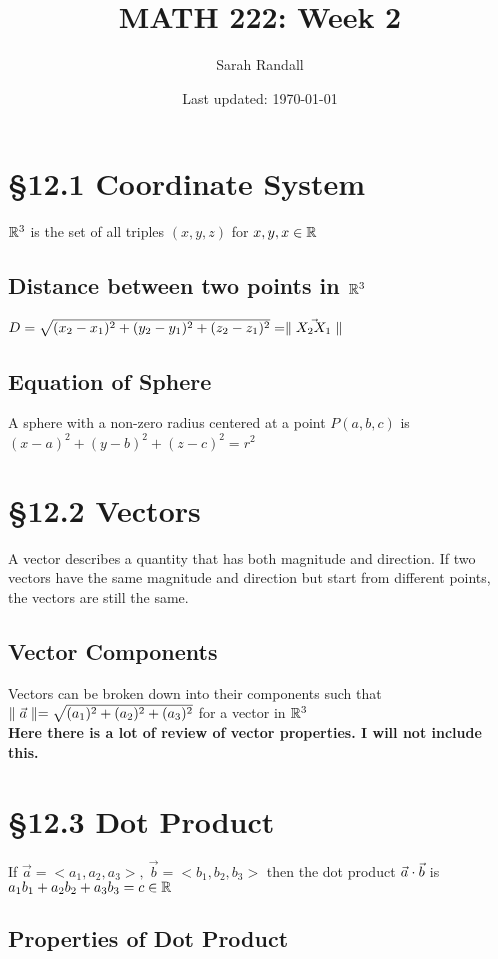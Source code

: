 \documentclass[12 pt]{article}
\author{Sarah Randall}
\date{Last updated: \today}
\title{MATH 222: Week 2}
\begin{document}
	\onehalfspacing
	\maketitle
	\tableofcontents
    \section{\S 12.1 Coordinate System}
        $\mathbb{R}^3$ is the set of all triples $(x,y,z)$ for $x,y,x\in\mathbb{R}$
        \subsection{Distance between two points in $\mathbb{R}^3$}

        $D=\sqrt{(x_2-x_1)^2+(y_2-y_1)^2+(z_2-z_1)^2}=\parallel \vec{X_2X_1} \parallel$
        \subsection{Equation of Sphere}

        A sphere with a non-zero radius centered at a point $P(a,b,c)$ is\\
        $(x-a)^2+(y-b)^2+(z-c)^2=r^2$
	\section{\S 12.2 Vectors}
		A vector describes a quantity that has both magnitude and direction. If two vectors have the same magnitude and direction but start from different points, the vectors are still the same.

		\subsection{Vector Components}

		Vectors can be broken down into their components such that $\parallel \vec{a} \parallel=\sqrt{(a_1)^2+(a_2)^2+(a_3)^2}$ for a vector in $\mathbb{R}^3$\\
		\textbf{Here there is a lot of review of vector properties. I will not include this.}
	\section{\S 12.3 Dot Product}
		\begin{def*}If $\vec{a}=<a_1,a_2,a_3>,\ \vec{b}=<b_1,b_2,b_3>$ then the dot product $\vec{a}\cdot\vec{b}$ is $a_1b_1+a_2b_2+a_3b_3=c\in\mathbb{R}$
		\end{def*}

		\subsection{Properties of Dot Product}
\end{document}
